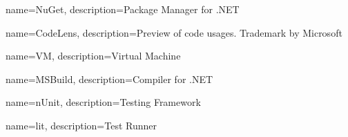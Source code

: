 {
	name=NuGet,
	description={Package Manager for .NET}
}

{
	name=CodeLens,
	description={Preview of code usages. Trademark by Microsoft}
}

{
	name=VM,
	description={Virtual Machine}
}

{
	name=MSBuild,
	description={Compiler for .NET}
}

{
	name=nUnit,
	description={Testing Framework}
}

{
	name=lit,
	description={Test Runner}
}

